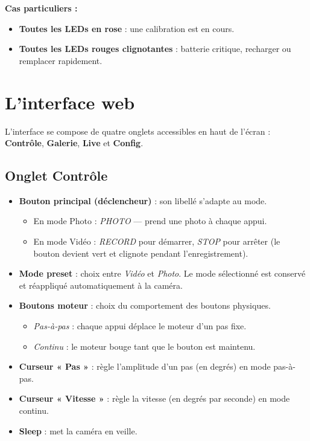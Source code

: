 \documentclass[11pt,a4paper]{article}
\begin{document}
\noindent
\textbf{Cas particuliers :}
\begin{itemize}[leftmargin=*]
  \item \textbf{Toutes les LEDs en rose} : une calibration est en cours.
  \item \textbf{Toutes les LEDs rouges clignotantes} : batterie critique, recharger
        ou remplacer rapidement.
\end{itemize}

\section{L'interface web}

L'interface se compose de quatre onglets accessibles en haut de l'écran :
\textbf{Contrôle}, \textbf{Galerie}, \textbf{Live} et \textbf{Config}.

\subsection{Onglet Contrôle}

\begin{itemize}[leftmargin=*]
  \item \textbf{Bouton principal (déclencheur)} : son libellé s'adapte au mode.
        \begin{itemize}
          \item En mode Photo : \emph{PHOTO} — prend une photo à chaque appui.
          \item En mode Vidéo : \emph{RECORD} pour démarrer, \emph{STOP} pour
                arrêter (le bouton devient vert et clignote pendant
                l'enregistrement).
        \end{itemize}
  \item \textbf{Mode preset} : choix entre \emph{Vidéo} et \emph{Photo}. Le mode
        sélectionné est conservé et réappliqué automatiquement à la caméra.
  \item \textbf{Boutons moteur} : choix du comportement des boutons physiques.
        \begin{itemize}
          \item \emph{Pas-à-pas} : chaque appui déplace le moteur d'un pas fixe.
          \item \emph{Continu} : le moteur bouge tant que le bouton est maintenu.
        \end{itemize}
  \item \textbf{Curseur « Pas »} : règle l'amplitude d'un pas (en degrés) en mode
        pas-à-pas.
  \item \textbf{Curseur « Vitesse »} : règle la vitesse (en degrés par seconde) en
        mode continu.
  \item \textbf{Sleep} : met la caméra en veille.
\end{itemize}
\end{document}
